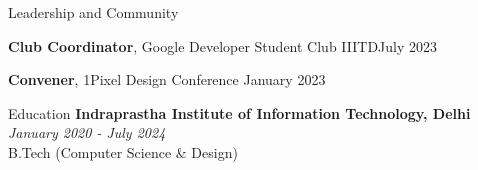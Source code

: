 \documentclass[10pt]{resume}
\begin{document}
    \begin{rSection}{Leadership and Community}
    
        \begin{rOthers}{\textbf{Club Coordinator}, Google Developer Student Club IIITD}{July 2023}
        \end{rOthers}
    
    
        \begin{rOthers}{\textbf{Convener}, 1Pixel Design Conference}
        {January 2023}
        \end{rOthers}
     
    \end{rSection}
    
    \begin{rSection}{Education}
        \textbf{Indraprastha Institute of Information Technology, Delhi} \hfill \textit{January 2020 - July 2024} \\ 
        B.Tech (Computer Science \& Design) \\
    \end{rSection}
\end{document}

